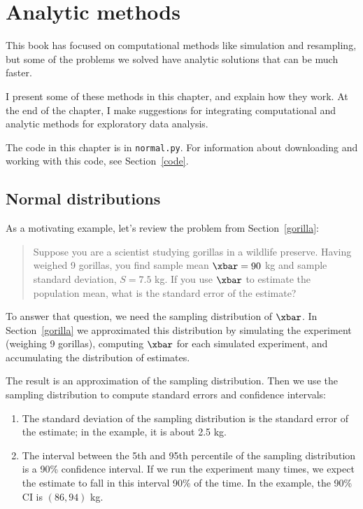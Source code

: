 \documentclass[12pt]{book}
\begin{document}
\chapter{Analytic methods}
\label{analysis}

This book has focused on computational methods like simulation and
resampling, but some of the problems we solved have
analytic solutions that can be much faster.

I present some of these methods in this chapter, and explain
how they work.  At the end of the chapter, I make suggestions
for integrating computational and analytic methods for exploratory
data analysis.

The code in this chapter is in {\tt normal.py}.  For information
about downloading and working with this code, see Section~\ref{code}.


\section{Normal distributions}
\label{why_normal}

As a motivating example, let's review the problem from
Section~\ref{gorilla}:

\begin{quotation}
\noindent Suppose you are a scientist studying gorillas in a wildlife
preserve.  Having weighed 9 gorillas, you find sample mean $\xbar=90$ kg and
sample standard deviation, $S=7.5$ kg.  If you use $\xbar$ to estimate
the population mean, what is the standard error of the estimate?
\end{quotation}

To answer that question, we need the sampling
distribution of $\xbar$.  In Section~\ref{gorilla} we approximated
this distribution by simulating the experiment (weighing
9 gorillas), computing $\xbar$ for each simulated experiment, and
accumulating the distribution of estimates.

The result is an approximation of the sampling distribution.  Then we
use the sampling distribution to compute standard errors and
confidence intervals:

\begin{enumerate}

\item The standard deviation of the sampling distribution is the
  standard error of the estimate; in the example, it is about
  2.5 kg.

\item The interval between the 5th and 95th percentile of the sampling
  distribution is a 90\% confidence interval.  If we run the
  experiment many times, we expect the estimate to fall in this
  interval 90\% of the time.  In the example, the 90\% CI is
  $(86, 94)$ kg.

\end{enumerate}
\end{document}
